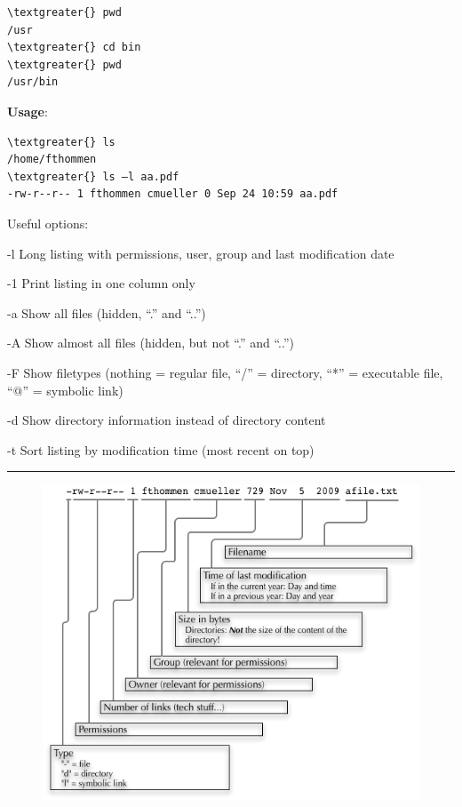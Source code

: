 \documentclass[letterpaper,10pt,english]{sphinxmanual}
\begin{document}
\begin{Verbatim}[commandchars=\\\{\}]
\textgreater{} pwd
/usr
\textgreater{} cd bin
\textgreater{} pwd
/usr/bin
\end{Verbatim}
\begin{description}
\item[{\textbf{Usage}:}] \leavevmode
{}

\end{description}

\begin{Verbatim}[commandchars=\\\{\}]
\textgreater{} ls
/home/fthommen
\textgreater{} ls –l aa.pdf
-rw-r--r-- 1 fthommen cmueller 0 Sep 24 10:59 aa.pdf
\end{Verbatim}

Useful options:
\begin{optionlist}{3cm}
\item [-l]  
Long listing with permissions, user, group and last modification date
\item [-1]  
Print listing in one column only
\item [-a]  
Show all files (hidden, “.” and “..”)
\item [-A]  
Show almost all files (hidden, but not “.” and “..”)
\item [-F]  
Show filetypes (nothing = regular file, “/” = directory, “*” = executable file, “@” = symbolic link)
\item [-d]  
Show directory information instead of  directory content
\item [-t]  
Sort listing by modification time (most recent on top)
\end{optionlist}


\bigskip\hrule{}\bigskip

\begin{figure}[htbp]
\centering

\includegraphics{_static/LongListingDeconstructed.png}
\end{figure}
\end{document}
